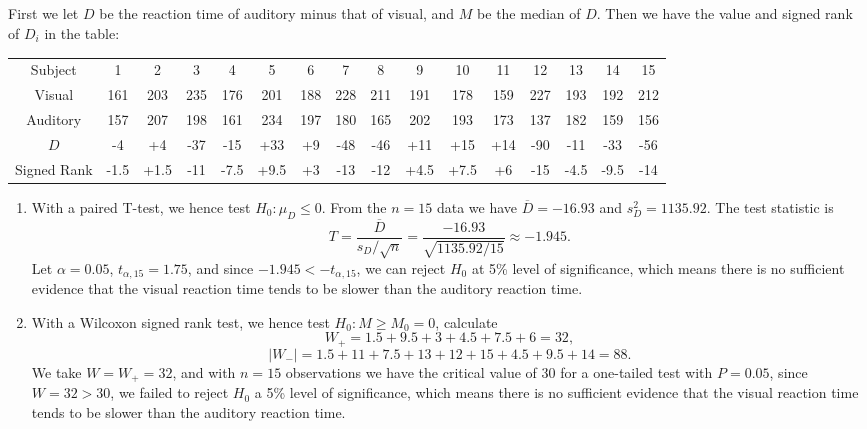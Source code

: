 \documentclass[11pt,a4paper]{article}
\author{Group 37}
\subtitle{Assignment}
\begin{document}
\maketitle

\subsection{}
First we let $D$ be the reaction time of auditory minus that of visual, and $M$ be the median of $D$. Then we have the value and signed rank of $D_i$ in the table:
\begin{center}
\small
\begin{tabular}{c|ccccccccccccccc}
Subject & 1 & 2 & 3 & 4 & 5 & 6 & 7 & 8 & 9 & 10 & 11 & 12 & 13 & 14 & 15 \\
Visual & 161 & 203 & 235 & 176 & 201 & 188 & 228 & 211 & 191 & 178 & 159 & 227 & 193 & 192 & 212 \\
Auditory & 157 & 207 & 198 & 161 & 234 & 197 & 180 & 165 & 202 & 193 & 173 & 137 & 182 & 159 & 156 \\
$D$ & -4 & +4 & -37 & -15 & +33 & +9 & -48 & -46 & +11 & +15 & +14 & -90 & -11 & -33 & -56 \\
Signed Rank & -1.5 & +1.5 & -11 & -7.5 & +9.5 & +3 & -13 & -12 & +4.5 & +7.5 & +6 & -15 & -4.5 & -9.5 & -14
\end{tabular}
\end{center}
\begin{enumerate}[label=\roman*)]
\item
With a paired T-test, we hence test $H_0 : \mu_D \leqslant 0$. From the $n = 15$ data we have $\overline{D} = -16.93$ and $s_D^2 = 1135.92$. The test statistic is
$$T=\frac{\overline{D}}{s_D/\sqrt{n}}=\frac{-16.93}{\sqrt{1135.92/15}}\approx-1.945.$$
Let $\alpha=0.05$, $t_{\alpha,15}=1.75$, and since $-1.945<-t_{\alpha,15}$, we can reject $H_0$ at 5\% level of significance, which means there is no sufficient evidence that the visual reaction time tends to be slower than the auditory reaction time.
\item
With a Wilcoxon signed rank test, we hence test $H_0 : M\geqslant M_0=0$, calculate
$$W_+=1.5+9.5+3+4.5+7.5+6=32,$$
$$|W_-|=1.5+11+7.5+13+12+15+4.5+9.5+14=88.$$
We take $W=W_+=32$, and with $n = 15$ observations we have the critical value of 30 for a one-tailed test with $P = 0.05$, since $W=32>30$, we failed to reject $H_0$ a 5\% level of significance, which means there is no sufficient evidence that the visual reaction time tends to be slower than the auditory reaction time.

\end{enumerate}
\end{document}
